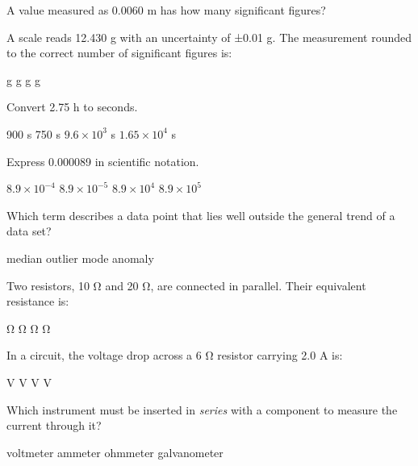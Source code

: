 \documentclass[12pt,letterpaper]{exam}
\begin{document}
\begin{questions}  
  
\question[1] A value measured as 0.0060 m has how many significant figures?    
\begin{oneparchoices}  
\end{oneparchoices}  
  
\question[1] A scale reads 12.430 g with an uncertainty of ±0.01 g. The measurement rounded to the correct number of significant figures is:    
\begin{oneparchoices}  
   g  
   g  
   g  
   g  
\end{oneparchoices}  
  
\question[1] Convert 2.75 h to seconds.    
\begin{oneparchoices}  
   900 s  
   750 s  
  \choice $9.6\times10^3$ s  
  \choice $1.65\times10^4$ s  
\end{oneparchoices}  
  
\question[1] Express 0.000089 in scientific notation.    
\begin{oneparchoices}  
  \choice $8.9\times10^{-4}$  
  \choice $8.9\times10^{-5}$  
  \choice $8.9\times10^{4}$  
  \choice $8.9\times10^{5}$  
\end{oneparchoices}  
  
\question[1] Which term describes a data point that lies well outside the general trend of a data set?    
\begin{oneparchoices}  
  \choice median  
  \choice outlier  
  \choice mode  
  \choice anomaly  
\end{oneparchoices}  
  
\question[1] Two resistors, 10 Ω and 20 Ω, are connected in parallel. Their equivalent resistance is:    
\begin{oneparchoices}  
   Ω  
   Ω  
   Ω  
   Ω  
\end{oneparchoices}  
  
\question[1] In a circuit, the voltage drop across a 6 Ω resistor carrying 2.0 A is:    
\begin{oneparchoices}  
   V  
   V  
   V  
   V  
\end{oneparchoices}  
  
\question[1] Which instrument must be inserted in \emph{series} with a component to measure the current through it?    
\begin{oneparchoices}  
  \choice voltmeter  
  \choice ammeter  
  \choice ohmmeter  
  \choice galvanometer  
\end{oneparchoices}  
  

\end{questions}
\end{document}
